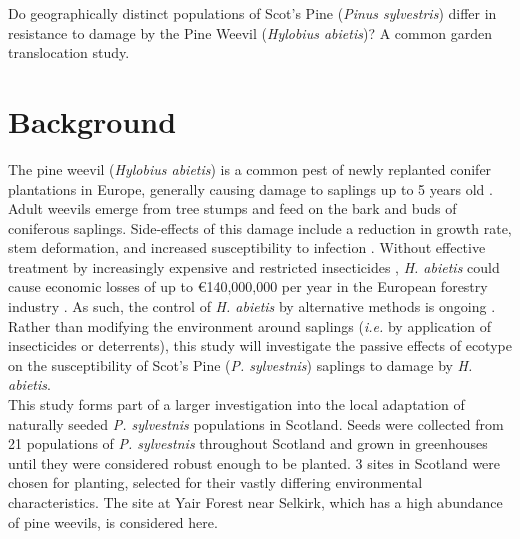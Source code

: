 \documentclass[a4paper,12pt,]{article}
\begin{document}

\raggedright{{\large{Do geographically distinct populations of Scot's Pine (\textit{Pinus sylvestris}) differ in resistance to damage by the Pine Weevil (\textit{Hylobius abietis})? A common garden translocation study.}}}

\section*{\large{Background}}
The pine weevil (\textit{Hylobius abietis}) is a common pest of newly replanted conifer plantations in Europe, generally causing damage to saplings up to  5 years old \citep{Dillon2008}. Adult weevils emerge from tree stumps and feed on the bark and buds of coniferous saplings. Side-effects of this damage include a reduction in growth rate, stem deformation, and increased susceptibility to infection \citep{Leather1999}. Without effective treatment by increasingly expensive and restricted insecticides \citep{Osteen2002}, \textit{H. abietis} could cause economic losses of up to \euro{}140,000,000 per year in the European forestry industry \citep{Langstrom2004}. As such, the control of \textit{H. abietis} by alternative methods is ongoing \citep{Dillon2008, Ennis2010, Luoranen2012, Nordlander2009}. 
\\[0.3cm]
Rather than modifying the environment around saplings (\textit{i.e.} by application of insecticides or deterrents), this study will investigate the passive effects of ecotype on the susceptibility of Scot's Pine (\textit{P. sylvestnis}) saplings to damage by \textit{H. abietis}. 
\\[0.3cm]
This study forms part of a larger investigation into the local adaptation of naturally seeded \textit{P. sylvestnis} populations in Scotland. Seeds were collected from 21 populations of  \textit{P. sylvestnis} throughout Scotland and grown in greenhouses until they were considered robust enough to be planted. 3 sites in Scotland were chosen for planting, selected for their vastly differing environmental characteristics. The site at Yair Forest near Selkirk, which has a high abundance of pine weevils, is considered here.
\end{document}

